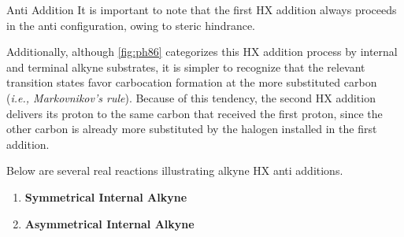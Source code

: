 \documentclass[10pt]{article}
\begin{document}
\begin{core}[label=core:hx_anti_addition]{ Anti Addition}
        It is important to note that the first HX addition always proceeds in the anti configuration, owing to steric hindrance.

        Additionally, although \autoref{fig:ph86} categorizes this HX addition process by internal and terminal alkyne substrates, it is simpler to recognize that the relevant transition states favor carbocation formation at the more substituted carbon (\textit{i.e., Markovnikov's rule}). Because of this tendency, the second HX addition delivers its proton to the same carbon that received the first proton, since the other carbon is already more substituted by the halogen installed in the first addition.

        Below are several real reactions illustrating alkyne HX anti additions.

        \begin{enumerate}

          \item \textbf{Symmetrical Internal Alkyne}


          \item \textbf{Asymmetrical Internal Alkyne}



\end{enumerate}
\end{core}
\end{document}
